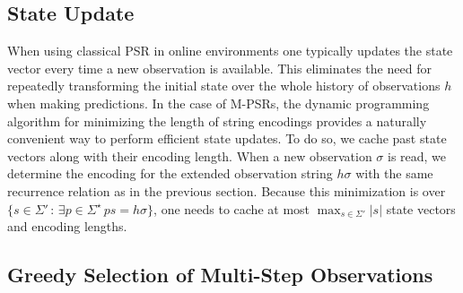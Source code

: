 \documentclass[letterpaper]{article}
\newcommand{\sstar}{\Sigma^\star}
\begin{document}

\subsection{State Update}

When using classical PSR in online environments one typically updates the state vector every time a new observation is available. This eliminates the need for repeatedly transforming the initial state over the whole history of observations $h$ when making predictions. In the case of M-PSRs, the dynamic programming algorithm for minimizing the length of string encodings provides a naturally convenient way to perform efficient state updates. To do so, we cache past state vectors along with their encoding length. When a new observation $\sigma$ is read, we determine the encoding for the extended observation string $h \sigma$ with the same recurrence relation as in the previous section. Because this minimization is over $\{s \in \Sigma' \,:\, \exists p \in \sstar \, ps= h\sigma\}$, one needs to cache at most $\max_{s \in \Sigma'} |s|$ state vectors and encoding lengths. 

\subsection{Greedy Selection of Multi-Step Observations}

%
%
%
%
%
\end{document}
